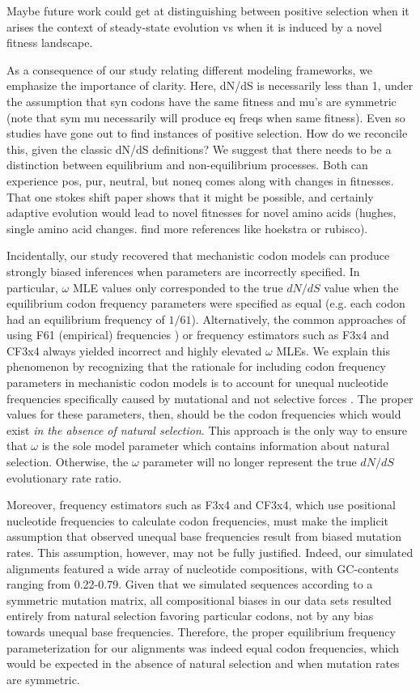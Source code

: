 \documentclass[11pt]{article}
\begin{document}
Maybe future work could get at distinguishing between positive selection when it arises the context of steady-state evolution vs when it is induced by a novel fitness landscape.

As a consequence of our study relating different modeling frameworks, we emphasize the importance of clarity.
Here, dN/dS is necessarily less than 1, under the assumption that syn codons have the same fitness and mu's are symmetric (note that sym mu necessarily will produce eq freqs when same fitness). Even so studies have gone out to find instances of positive selection. How do we reconcile this, given the classic dN/dS definitions? We suggest that there needs to be a distinction between equilibrium and non-equilibrium processes. Both can experience pos, pur, neutral, but noneq comes along with changes in fitnesses. That one stokes shift paper shows that it might be possible, and certainly adaptive evolution would lead to novel fitnesses for novel amino acids (hughes, single amino acid changes. find more references like hoekstra or rubisco).




Incidentally, our study recovered that mechanistic codon models can produce strongly biased inferences when parameters are incorrectly specified. In particular, $\omega$ MLE values only corresponded to the true $dN/dS$ value when the equilibrium codon frequency parameters were specified as equal (e.g. each codon had an equilibrium frequency of $1/61$). Alternatively, the common approaches of using F61 (empirical) frequencies \cite{GoldmanYang1994}) or frequency estimators such as F3x4 \cite{MuseGaut1994} and CF3x4 \cite{Pond2010} always yielded incorrect and highly elevated $\omega$ MLEs. We explain this phenomenon by recognizing that the rationale for including codon frequency parameters in mechanistic codon  models is to account for unequal nucleotide frequencies specifically caused by mutational and not selective forces \cite{YN00, Yang2006}. The proper values for these parameters, then, should be the codon frequencies which would exist \textit{in the absence of natural selection}. This approach is the only way to ensure that $\omega$ is the sole model parameter which contains information about natural selection. Otherwise, the $\omega$ parameter will no longer represent the true $dN/dS$ evolutionary rate ratio.

Moreover, frequency estimators such as F3x4 and CF3x4, which use positional nucleotide frequencies to calculate codon frequencies, must make the implicit assumption that observed unequal base frequencies result from biased mutation rates.
This assumption, however, may not be fully justified. Indeed, our simulated alignments featured a wide array of nucleotide compositions, with GC-contents ranging from 0.22-0.79. Given that we simulated sequences according to a symmetric mutation matrix, all compositional biases in our data sets resulted entirely from natural selection favoring particular codons, not by any bias towards unequal base frequencies. Therefore, the proper equilibrium frequency parameterization for our alignments was indeed equal codon frequencies, which would be expected in the absence of natural selection and when mutation rates are symmetric. 
\end{document}
